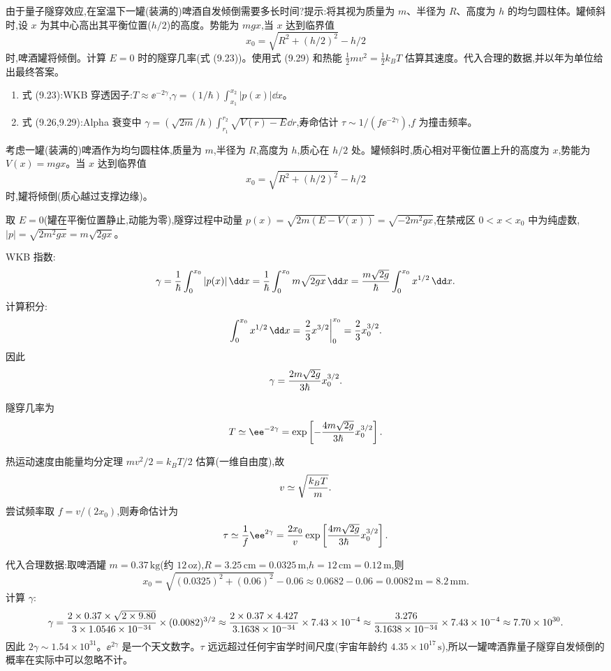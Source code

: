 \begin{question}
由于量子隧穿效应,在室温下一罐(装满的)啤酒自发倾倒需要多长时间?提示:将其视为质量为 $m$、半径为 $R$、高度为 $h$ 的均匀圆柱体。罐倾斜时,设 $x$ 为其中心高出其平衡位置($h/2$)的高度。势能为 $mgx$,当 $x$ 达到临界值
\[
x_0=\sqrt{R^2+(h/2)^2}-h/2
\]
时,啤酒罐将倾倒。计算 $E=0$ 时的隧穿几率(式 (9.23))。使用式 (9.29) 和热能 $\frac12mv^2=\frac12k_BT$ 估算其速度。代入合理的数据,并以年为单位给出最终答案。

\par\smallskip
{}
\begin{enumerate}[leftmargin=2.2em,itemsep=0.12em,topsep=0.12em,parsep=0pt]
\item 式 (9.23):WKB 穿透因子:$T\approx \ee^{-2\gamma}$,$\gamma=(1/\hbar)\int_{x_1}^{x_2}|p(x)|\dd x$。
\item 式 (9.26,9.29):Alpha 衰变中 $\gamma=(\sqrt{2m}/\hbar)\int_{r_1}^{r_2}\sqrt{V(r)-E}\dd r$,寿命估计 $\tau\sim 1/(f \ee^{-2\gamma})$,$f$ 为撞击频率。
\end{enumerate}

\end{question}
\begin{solution}
考虑一罐(装满的)啤酒作为均匀圆柱体,质量为 $m$,半径为 $R$,高度为 $h$,质心在 $h/2$ 处。罐倾斜时,质心相对平衡位置上升的高度为 $x$,势能为 $V(x)=mgx$。当 $x$ 达到临界值
\[
x_0=\sqrt{R^2+(h/2)^2}-h/2
\]
时,罐将倾倒(质心越过支撑边缘)。

取 $E=0$(罐在平衡位置静止,动能为零),隧穿过程中动量 $p(x)=\sqrt{2m(E-V(x))}=\sqrt{-2m^2gx}$,在禁戒区 $0<x<x_0$ 中为纯虚数,$|p|=\sqrt{2m^2gx}=m\sqrt{2gx}$。

WKB 指数:
\[
\gamma={1\over\hbar}\int_0^{x_0}|p(x)|\,\dd x
={1\over\hbar}\int_0^{x_0}m\sqrt{2gx}\,\dd x
={m\sqrt{2g}\over\hbar}\int_0^{x_0}x^{1/2}\,\dd x.
\]
计算积分:
\[
\int_0^{x_0}x^{1/2}\,\dd x=\left.{2\over3}x^{3/2}\right|_0^{x_0}={2\over3}x_0^{3/2}.
\]
因此
\[
\gamma={2m\sqrt{2g}\over3\hbar}x_0^{3/2}.
\]

隧穿几率为
\[
T\simeq \ee^{-2\gamma}
=\exp\left[-{4m\sqrt{2g}\over3\hbar}x_0^{3/2}\right].
\]

热运动速度由能量均分定理 $mv^2/2=k_BT/2$ 估算(一维自由度),故
\[
v\simeq\sqrt{k_BT\over m}.
\]
尝试频率取 $f=v/(2x_0)$,则寿命估计为
\[
\tau\simeq{1\over f}\ee^{2\gamma}
={2x_0\over v}\exp\left[{4m\sqrt{2g}\over3\hbar}x_0^{3/2}\right].
\]

代入合理数据:取啤酒罐 $m=0.37\,\mathrm{kg}$(约 $12\,\mathrm{oz}$),$R=3.25\,\mathrm{cm}=0.0325\,\mathrm{m}$,$h=12\,\mathrm{cm}=0.12\,\mathrm{m}$,则
\[
x_0=\sqrt{(0.0325)^2+(0.06)^2}-0.06\approx0.0682-0.06=0.0082\,\mathrm{m}=8.2\,\mathrm{mm}.
\]
计算 $\gamma$:
\[
\gamma={2\times0.37\times\sqrt{2\times9.80}\over3\times1.0546\times10^{-34}}\times(0.0082)^{3/2}
\approx{2\times0.37\times4.427\over3.1638\times10^{-34}}\times7.43\times10^{-4}
\approx{3.276\over3.1638\times10^{-34}}\times7.43\times10^{-4}
\approx 7.70\times10^{30}.
\]
因此 $2\gamma\sim1.54\times10^{31}$。$\ee^{2\gamma}$ 是一个天文数字。$\tau$ 远远超过任何宇宙学时间尺度(宇宙年龄约 $4.35\times10^{17}\,\mathrm{s}$),所以一罐啤酒靠量子隧穿自发倾倒的概率在实际中可以忽略不计。
\end{solution}

